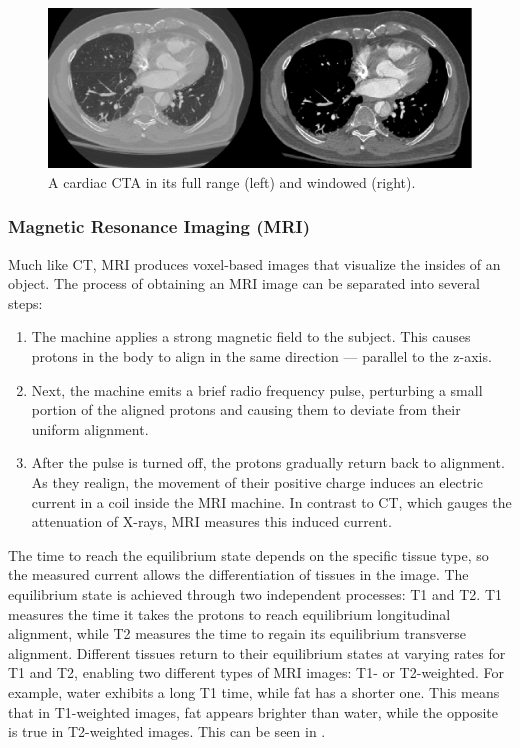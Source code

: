 \begin{figure}[hb]
 \centering
 \includegraphics[width=\linewidth]{images/windowing-example}
 \caption{A cardiac CTA in its full range (left) and windowed (right). \cite{radlAVTMulticenterAortic2022a}}
 \label{fig:windowing-example}
 \end{figure}

\subsubsection{Magnetic Resonance Imaging (MRI)}

Much like CT, MRI produces voxel-based images that visualize the insides of an object. The process of obtaining an MRI image can be separated into several steps: 

\begin{enumerate}
	\item The machine applies a strong magnetic field to the subject. This causes protons in the body to align in the same direction --- parallel to the z-axis.
	\item Next, the machine emits a brief radio frequency pulse, perturbing a small portion of the aligned protons and causing them to deviate from their uniform alignment.
	\item After the pulse is turned off, the protons gradually return back to alignment. As they realign, the movement of their positive charge induces an electric current in a coil inside the MRI machine. In contrast to CT, which gauges the attenuation of X-rays, MRI measures this induced current.
\end{enumerate}

The time to reach the equilibrium state depends on the specific tissue type, so the measured current allows the differentiation of tissues in the image. The equilibrium state is achieved through two independent processes: T1 and T2. T1 measures the time it takes the protons to reach equilibrium longitudinal alignment, while T2 measures the time to regain its equilibrium transverse alignment. Different tissues return to their equilibrium states at varying rates for T1 and T2, enabling two different types of MRI images: T1- or T2-weighted. For example, water exhibits a long T1 time, while fat has a shorter one. This means that in T1-weighted images, fat appears brighter than water, while the opposite is true in T2-weighted images. This can be seen in .

